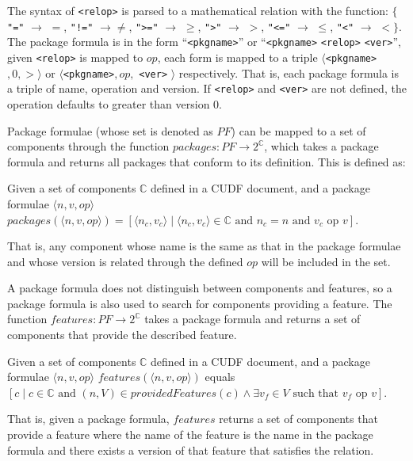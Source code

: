 The syntax of \verb+<relop>+ is parsed to a mathematical relation with the function:  
$\{$ \verb+"="+ $\rightarrow$ $=$, \verb+"!="+ $\rightarrow \not =$, 
\verb+">="+ $\rightarrow$ $\geq$, \verb+">"+ $\rightarrow$ $>$, \verb+"<="+ $\rightarrow$ $\leq$, \verb+"<"+ $\rightarrow$ $<$$\}$.
The package formula is in the form ``\verb+<pkgname>+'' or  ``\verb+<pkgname>+ \verb+<relop>+ \verb+<ver>+'',
given \verb+<relop>+ is mapped to $op$, each form is mapped to a triple $\langle $\verb+<pkgname>+$,0,>\rangle$ or $\langle$\verb+<pkgname>+$,op,$ \verb+<ver>+ $\rangle$ respectively.
That is, each package formula is a triple of name, operation and version.
If \verb+<relop>+ and \verb+<ver>+ are not defined, the operation defaults to greater than version 0.

Package formulae (whose set is denoted as $PF$) can be mapped to a set of components through the function $packages: PF \rightarrow 2^{\mathbb{C}}$,
which takes a package formula and returns all packages that conform to its definition.
This is defined as:
\begin{defs}
Given a set of components $\mathbb{C}$ defined in a CUDF document, and a package formulae $\langle n,v,op\rangle$
$packages(\langle n,v,op\rangle) = [\langle n_c,v_c \rangle \mid \langle n_c,v_c \rangle \in \mathbb{C} \mbox{ and } n_c = n \mbox{ and } v_c \mbox{ op } v]$.
\end{defs}
That is, any component whose name is the same as that in the package formulae and whose version is related through the defined $op$ will be included in the set.

A package formula does not distinguish between components and features, so a package formula is also used to search for components providing a feature.
The function $features: PF \rightarrow 2^{\mathbb{C}}$ takes a package formula and returns a set of components that provide the described feature.
\begin{defs}
Given a set of components $\mathbb{C}$ defined in a CUDF document, and a package formulae $\langle n,v,op\rangle$
$features(\langle n,v,op\rangle)$ equals 
$[c \mid c\in \mathbb{C} \mbox{ and } (n,V) \in providedFeatures(c) \wedge \exists v_f \in V \mbox { such that } v_f \mbox{ op } v ]$.
\end{defs}
That is, given a package formula, 
$features$ returns a set of components that provide a feature where the name of the feature is the name in the package formula 
and there exists a version of that feature that satisfies the relation. 

